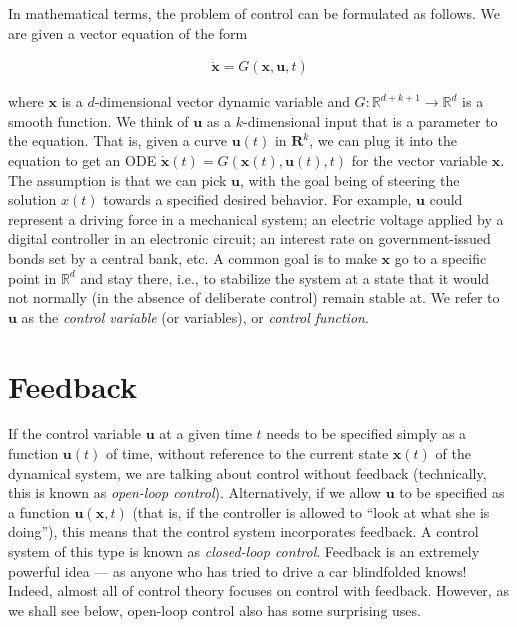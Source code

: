 \documentclass[11pt]{report}
\newcommand{\R}{\mathbb{R}}
\theoremstyle{plain}
\theoremstyle{definition}
\begin{document}
In mathematical terms, the problem of control can be
formulated as follows. We are given a vector equation
of the form

\begin{align*}
\dot{\mathbf{x}} = G(\mathbf{x},\mathbf{u},t)
\end{align*}

where $\mathbf{x}$ is a $d$-dimensional vector
dynamic variable and $G:\mathbb{R}^{d+k+1}\to\R^d$ is
a smooth function. We think of $\mathbf{u}$ as a
$k$-dimensional input that is a parameter to the
equation. That is, given a curve $\mathbf{u}(t)$ in
$\mathbf{R}^k$, we can plug it into the equation to
get an ODE
$\dot{\mathbf{x}}(t) =
G(\mathbf{x}(t),\mathbf{u}(t),t)$
for the vector variable $\mathbf{x}$. The assumption
is that we can pick $\mathbf{u}$, with the goal being
of steering the solution $x(t)$ towards a specified
desired behavior. For example, $\mathbf{u}$ could
represent a driving force in a mechanical system; an
electric voltage applied by a digital controller in an
electronic circuit; an interest rate on
government-issued bonds set by a central bank, etc. A
common goal is to make $\mathbf{x}$ go to a specific
point in $\mathbb{R}^d$ and stay there, i.e., to
stabilize the system at a state that it would not
normally (in the absence of deliberate control) remain
stable at. We refer to $\mathbf{u}$ as the \emph{control
variable} (or variables), or \emph{control function}.

\section{Feedback}
If the control variable $\mathbf{u}$ at a given time
$t$ needs to be specified simply as a function
$\mathbf{u}(t)$ of time, without reference to the
current state $\mathbf{x}(t)$ of the dynamical
system, we are talking about control without feedback
(technically, this is known as \emph{open-loop control}).
Alternatively, if we allow $\mathbf{u}$ to be
specified as a function $\mathbf{u}(\mathbf{x},t)$
(that is, if the controller is allowed to ``look at
what she is doing''), this means that the control
system incorporates feedback. A control system of this
type is known as \emph{closed-loop control}. Feedback is an
extremely powerful idea --- as anyone who has tried to
drive a car blindfolded knows! Indeed, almost all of
control theory focuses on control with feedback.
However, as we shall see below, open-loop control also
has some surprising uses.
\end{document}
